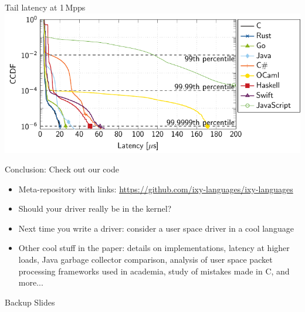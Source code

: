 \documentclass[NET,english,aspectratio=169,notitleframe]{tumbeamer}
\begin{document}
\begin{frame}{Tail latency at 1\,Mpps}
\hspace{1.7cm}\includegraphics[scale=1]{figures/latency-1/latency-ccdf-9.pdf}
\end{frame}





\begin{frame}{Conclusion: Check out our code}
\begin{itemize}
\item Meta-repository with links: \url{https://github.com/ixy-languages/ixy-languages}
\item Should your driver really be in the kernel?
\item Next time you write a driver: consider a user space driver in a cool language
\vspace{1ex}
\item Other cool stuff in the paper: details on implementations, latency at higher loads, Java garbage collector comparison, analysis of user space packet processing frameworks used in academia, study of mistakes made in C, and more...
\end{itemize}
\end{frame}

\begin{frame}
\centering\Huge Backup Slides
\end{frame}
\end{document}
